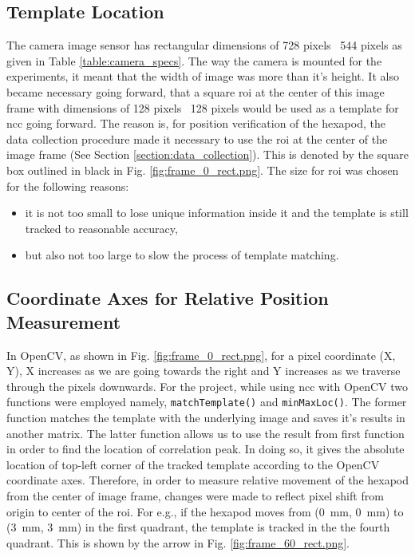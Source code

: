     \subsection*{Template Location}
        The camera image sensor has rectangular dimensions of 728 pixels \times \ 544 pixels as given in Table \ref{table:camera_specs}. The way the camera is mounted for the experiments, it meant that the width of image was more than it's height. It also became necessary going forward, that a square \gls{roi} at the center of this image frame with dimensions of 128 pixels \times \ 128 pixels would be used as a template for \gls{ncc} going forward. The reason is, for position verification of the hexapod, the data collection procedure made it necessary to use the \gls{roi} at the center of the image frame (See Section \ref{section:data_collection}). This is denoted by the square box outlined in black in Fig. \ref{fig:frame_0_rect.png}. The size for \gls{roi} was chosen for the following reasons:
        \begin{itemize}
            \item it is not too small to lose unique information inside it and the template is still tracked to reasonable accuracy,
            \item but also not too large to slow the process of template matching.
        \end{itemize}
        
    \subsection*{Coordinate Axes for Relative Position Measurement}
        In OpenCV, as shown in Fig. \ref{fig:frame_0_rect.png}, for a pixel coordinate (X, Y), X increases as we are going towards the right and Y increases as we traverse through the pixels downwards. For the project, while using \gls{ncc} with OpenCV two functions were employed namely, \texttt{matchTemplate()} and \texttt{minMaxLoc()}. The former function matches the template with the underlying image and saves it's results in another matrix. The latter function allows us to use the result from first function in order to find the location of correlation peak. In doing so, it gives the absolute location of top-left corner of the tracked template according to the OpenCV coordinate axes. Therefore, in order to measure relative movement of the hexapod from the center of image frame, changes were made to reflect pixel shift from origin to center of the \gls{roi}. For e.g., if the hexapod moves from (\SI{0}{\milli\meter}, \SI{0}{\milli\meter}) to (\SI{3}{\milli\meter}, \SI{3}{\milli\meter}) in the first quadrant, the template is tracked in the the fourth quadrant. This is shown by the arrow in Fig. \ref{fig:frame_60_rect.png}. 

